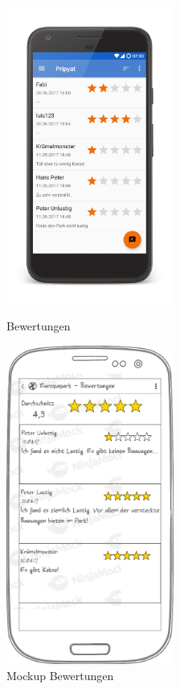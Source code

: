 \begin{figure}[h]
    \centering
    \begin{minipage}{0.49\textwidth}
        \centering
        \includegraphics[width=0.49\textwidth, trim=150 200 200 200, 
        clip]{img/screenshots/ss_bewertungen.png}
        \caption{Bewertungen}
		\label{figure:implementierungbewertungen}
    \end{minipage}
    \begin{minipage}{0.49\textwidth}
        \centering
        \includegraphics[width=0.49\textwidth]{img/mockups/m_park_bewertungen.png}
        \caption{Mockup Bewertungen}
    \end{minipage}
\end{figure} 

